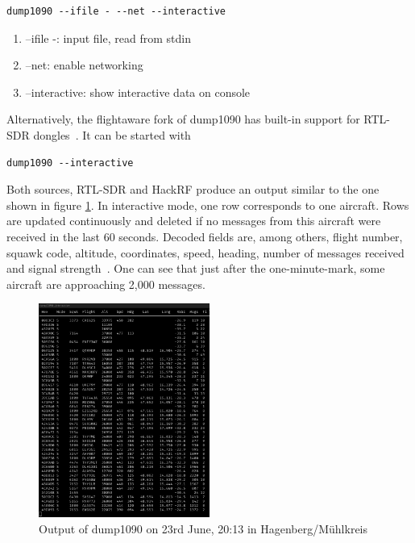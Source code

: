 \documentclass[conference]{IEEEtran}
\begin{document}
\begin{lstlisting}
dump1090 --ifile - --net --interactive
\end{lstlisting}
\begin{enumerate}
	\item --ifile -: input file, read from stdin
	\item --net: enable networking
	\item --interactive: show interactive data on console
\end{enumerate}
Alternatively, the flightaware fork of dump1090 has built-in support for RTL-SDR dongles~\cite{Github19dump1090-fa}. It can be started with
\begin{lstlisting}
dump1090 --interactive
\end{lstlisting}
Both sources, RTL-SDR and HackRF produce an output similar to the one shown in figure \ref{fig:dump1090screenshot}. In interactive mode, one row corresponds to one aircraft. Rows are updated continuously and deleted if no messages from this aircraft were received in the last 60 seconds. Decoded fields are, among others, flight number, squawk code, altitude, coordinates, speed, heading, number of messages received and signal strength~\cite{dump109019Github}. One can see that just after the one-minute-mark, some aircraft are approaching 2,000 messages. 
\begin{figure}
	\centering
	\caption{Output of dump1090 on 23rd June, 20:13 in Hagenberg/Mühlkreis} \label{fig:dump1090screenshot}
	\includegraphics[width=0.5\textwidth]{dump1090_screenshot}
\end{figure}
\end{document}
